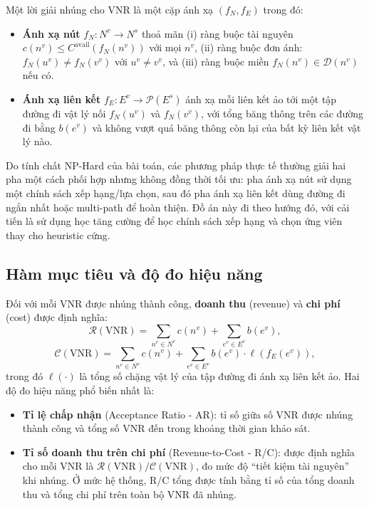 \documentclass[../DoAn.tex]{subfiles}
\begin{document}
Một lời giải nhúng cho VNR là một cặp ánh xạ $(f_N, f_E)$ trong đó:
\begin{itemize}
\item \textbf{Ánh xạ nút} $f_N : N^v \to N^s$ thoả mãn (i) ràng buộc tài nguyên $c(n^v) \leq C^{\text{avail}}(f_N(n^v))$ với mọi $n^v$, (ii) ràng buộc đơn ánh: $f_N(u^v) \neq f_N(v^v)$ với $u^v \neq v^v$, và (iii) ràng buộc miền $f_N(n^v) \in \mathcal{D}(n^v)$ nếu có.
\item \textbf{Ánh xạ liên kết} $f_E : E^v \to \mathcal{P}(E^s)$ ánh xạ mỗi liên kết ảo tới một tập đường đi vật lý nối $f_N(u^v)$ và $f_N(v^v)$, với tổng băng thông trên các đường đi bằng $b(e^v)$ và không vượt quá băng thông còn lại của bất kỳ liên kết vật lý nào.
\end{itemize}

Do tính chất NP-Hard của bài toán, các phương pháp thực tế thường giải hai pha một cách phối hợp nhưng không đồng thời tối ưu: pha ánh xạ nút sử dụng một chính sách xếp hạng/lựa chọn, sau đó pha ánh xạ liên kết dùng đường đi ngắn nhất hoặc multi-path để hoàn thiện. Đồ án này đi theo hướng đó, với cải tiến là sử dụng học tăng cường để học chính sách xếp hạng và chọn ứng viên thay cho heuristic cứng.

\subsection{Hàm mục tiêu và độ đo hiệu năng}

Đối với mỗi VNR được nhúng thành công, \textbf{doanh thu} (revenue) và \textbf{chi phí} (cost) được định nghĩa:
\begin{equation}
    \mathcal{R}(\text{VNR}) = \sum_{n^v \in N^v} c(n^v) + \sum_{e^v \in E^v} b(e^v),
    \label{eq:revenue}
\end{equation}
\begin{equation}
    \mathcal{C}(\text{VNR}) = \sum_{n^v \in N^v} c(n^v) + \sum_{e^v \in E^v} b(e^v) \cdot \ell(f_E(e^v)),
    \label{eq:cost}
\end{equation}
trong đó $\ell(\cdot)$ là tổng số chặng vật lý của tập đường đi ánh xạ liên kết ảo. Hai độ đo hiệu năng phổ biến nhất là:
\begin{itemize}
\item \textbf{Tỉ lệ chấp nhận} (Acceptance Ratio - AR): tỉ số giữa số VNR được nhúng thành công và tổng số VNR đến trong khoảng thời gian khảo sát.
\item \textbf{Tỉ số doanh thu trên chi phí} (Revenue-to-Cost - R/C): được định nghĩa cho mỗi VNR là $\mathcal{R}(\text{VNR}) / \mathcal{C}(\text{VNR})$, đo mức độ ``tiết kiệm tài nguyên'' khi nhúng. Ở mức hệ thống, R/C tổng được tính bằng tỉ số của tổng doanh thu và tổng chi phí trên toàn bộ VNR đã nhúng.
\end{itemize}
\end{document}
